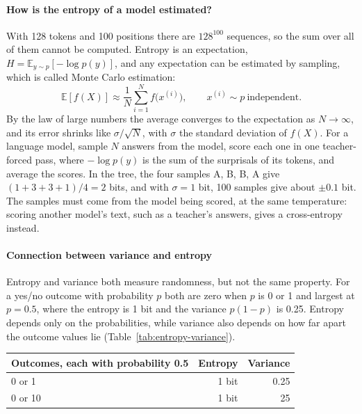 {\paragraph{How is the entropy of a model estimated?}
With 128 tokens and 100 positions there are \(128^{100}\) sequences, so the sum over all of them cannot be computed.
Entropy is an expectation, \(H=\mathbb{E}_{y\sim p}[-\log p(y)]\), and any expectation can be estimated by sampling, which is called Monte Carlo estimation:
\[
\mathbb{E}[f(X)]\approx\frac{1}{N}\sum_{i=1}^{N} f\bigl(x^{(i)}\bigr),\qquad x^{(i)}\sim p\ \text{independent}.
\]
By the law of large numbers the average converges to the expectation as \(N\to\infty\), and its error shrinks like \(\sigma/\sqrt{N}\), with \(\sigma\) the standard deviation of \(f(X)\).
For a language model, sample \(N\) answers from the model, score each one in one teacher-forced pass, where \(-\log p(y)\) is the sum of the surprisals of its tokens, and average the scores.
In the tree, the four samples A, B, B, A give \((1+3+3+1)/4=2\) bits, and with \(\sigma=1\) bit, 100 samples give about \(\pm 0.1\) bit.
The samples must come from the model being scored, at the same temperature: scoring another model's text, such as a teacher's answers, gives a cross-entropy instead.

}\paragraph{Connection between variance and entropy}
Entropy and variance both measure randomness, but not the same property.
For a yes/no outcome with probability \(p\) both are zero when \(p\) is 0 or 1 and largest at \(p=0.5\), where the entropy is 1 bit and the variance \(p(1-p)\) is 0.25.
Entropy depends only on the probabilities, while variance also depends on how far apart the outcome values lie (Table~\ref{tab:entropy-variance}).
\begin{center}
\label{tab:entropy-variance}
\begin{tabular}{lrr}
\hline
Outcomes, each with probability 0.5 & Entropy & Variance\\
\hline
0 or 1 & 1 bit & 0.25\\
0 or 10 & 1 bit & 25\\
\hline
\end{tabular}
\end{center}


